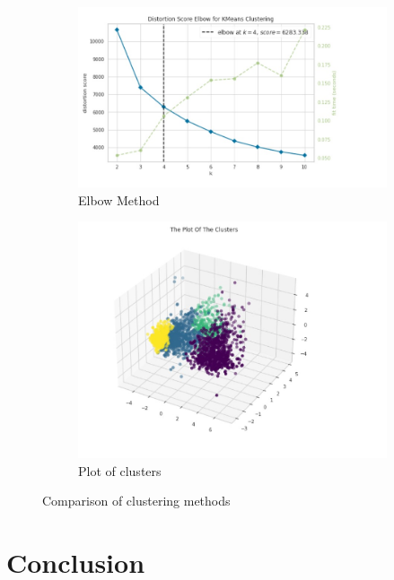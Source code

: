 \documentclass{josis}
\begin{document}
\begin{figure}
    \centering
    \begin{subfigure}{0.5\textwidth}
        \centering
        \includegraphics[width=\linewidth]{Elbow.jpeg}
        \caption{Elbow Method}
    \end{subfigure}%
    \begin{subfigure}{0.5\textwidth}
        \centering
        \includegraphics[width=\linewidth]{plotofclusters.jpeg}
        \caption{Plot of clusters}
    \end{subfigure}
    \caption{Comparison of clustering methods}
\end{figure}
\section{Conclusion}
\end{document}

